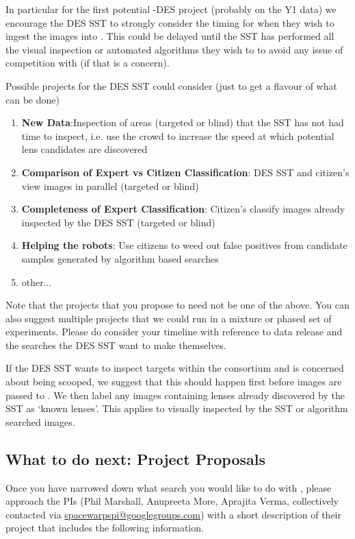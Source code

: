 \documentclass[a4paper,twocolumn]{article}
\begin{document}
In particular for the first potential \sw-DES project (probably on the Y1 data) we encourage the DES SST to strongly consider the timing for when they wish to ingest the images into \sw. This could be delayed until the SST has performed all the visual inspection or automated algorithms they wish to to avoid any issue of competition with \sw (if that is a concern).

Possible projects for the DES SST could consider (just to get a flavour of what can be done)
\begin{enumerate}
\item \textbf{New Data}:Inspection of areas (targeted or blind) that the SST has not had time to inspect, i.e. use the crowd to increase the speed at which potential lens candidates are discovered
\item \textbf{Comparison of Expert vs Citizen Classification}: DES SST and citizen's view images in parallel (targeted or blind)
\item \textbf{Completeness of Expert Classification}: Citizen's classify images already inspected by the DES SST (targeted or blind)
\item \textbf{Helping the robots}: Use citizens to weed out false positives from candidate samples generated by algorithm based searches
\item other...
\end{enumerate}

Note that the projects that you propose to \sw need not be one of the above. You can also suggest multiple projects that we could run in a mixture or phased set of experiments. Please do consider your timeline with reference to data release and the searches the DES SST want to make themselves.

If the DES SST wants to inspect targets within the consortium and is concerned about being scooped, we suggest that this should happen first before images are passed to \sw. We then label any images containing lenses already discovered by the SST as `known lenses'. This applies to visually inspected by the SST or algorithm searched images. 


\subsection{What to do next: Project Proposals}
Once you have narrowed down what search you would like to do with \sw, please approach the \sw PIs (Phil Marshall, Anupreeta More, Aprajita Verma, collectively contacted via \href{mailto:spacewarpspi@googlegroups.com}{spacewarpspi@googlegroups.com}) with a short description of their project that includes the following information.
\end{document}
